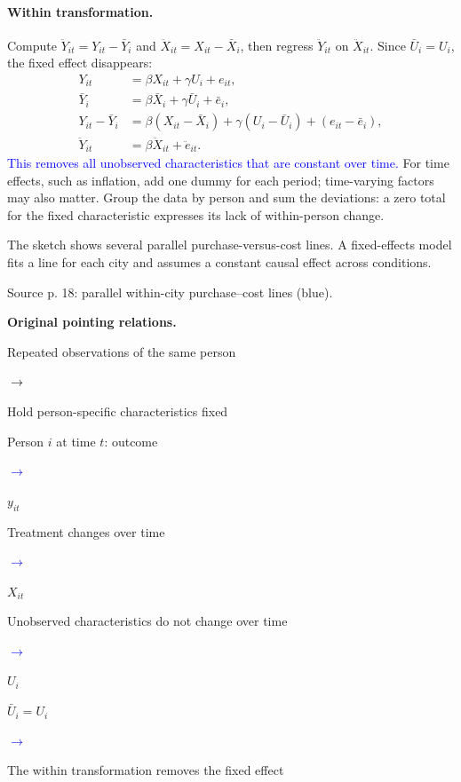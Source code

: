 \documentclass[11pt,a4paper]{article}
\newcommand{\inkblue}[1]{\textcolor{blue}{#1}}
\newcommand{\notearrow}[3]{%
\par\Needspace{6\baselineskip}\smallskip
\noindent\begin{minipage}[c]{0.43\linewidth}\raggedright\color{#1}#2\end{minipage}%
\hfill\textcolor{#1}{\(\longrightarrow\)}\hfill%
\begin{minipage}[c]{0.43\linewidth}\raggedright#3\end{minipage}\par\smallskip}
\begin{document}
{\paragraph{Within transformation.}
Compute $\ddot Y_{it}=Y_{it}-\bar Y_i$ and $\ddot X_{it}=X_{it}-\bar X_i$, then regress $\ddot Y_{it}$ on $\ddot X_{it}$. Since $\bar U_i=U_i$, the fixed effect disappears:
\begin{align*}
Y_{it}&=\beta X_{it}+\gamma U_i+e_{it},\\
\bar Y_i&=\beta\bar X_i+\gamma\bar U_i+\bar e_i,\\
Y_{it}-\bar Y_i&=\beta(X_{it}-\bar X_i)+\gamma(U_i-\bar U_i)+(e_{it}-\bar e_i),\\
\ddot Y_{it}&=\beta\ddot X_{it}+\ddot e_{it}.
\end{align*}
\inkblue{This removes all unobserved characteristics that are constant over time.} For time effects, such as inflation, add one dummy for each period; time-varying factors may also matter. Group the data by person and sum the deviations: a zero total for the fixed characteristic expresses its lack of within-person change.

The sketch shows several parallel purchase-versus-cost lines. A fixed-effects model fits a line for each city and assumes a constant causal effect across conditions.

\begin{center}
\par{\small Source p. 18: parallel within-city purchase--cost lines (blue).}
\end{center}
\par{}\smallskip\textbf{Original pointing relations.}\par\smallskip
\notearrow{black}{Repeated observations of the same person}{Hold person-specific characteristics fixed}
\notearrow{blue}{Person $i$ at time $t$: outcome}{$y_{it}$}
\notearrow{blue}{Treatment changes over time}{$X_{it}$}
\notearrow{blue}{Unobserved characteristics do not change over time}{$U_i$}
\notearrow{blue}{$\bar U_i=U_i$}{The within transformation removes the fixed effect}
}
\end{document}
